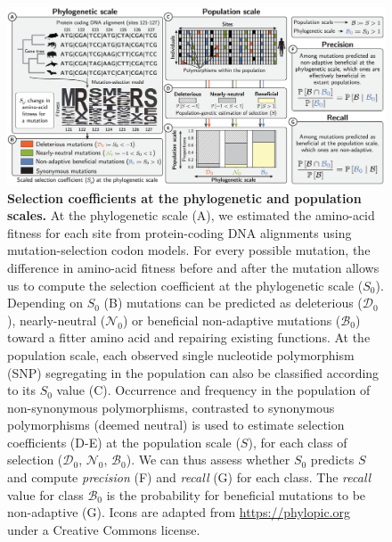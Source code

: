 \documentclass[10pt,letterpaper]{article}
\newcommand{\Sphy}{S_{0}}
\newcommand{\SphyDel}{\mathcal{D}_0}
\newcommand{\SphyNeu}{\mathcal{N}_0}
\newcommand{\SphyBen}{\mathcal{B}_0}
\newcommand{\Spop}{S}
\begin{document}
\begin{figure}[!ht]
\begin{adjustwidth}{-2.25in}{0in} %
\centering
\includegraphics[width=1.4\textwidth, page=1] {figure2.eps}
\caption{
{\bf Selection coefficients at the phylogenetic and population scales.}
At the phylogenetic scale (A), we estimated the amino-acid fitness for each site from protein-coding DNA alignments using mutation-selection codon models.
For every possible mutation, the difference in amino-acid fitness before and after the mutation allows us to compute the selection coefficient at the phylogenetic scale ($\Sphy$).
Depending on $\Sphy$ (B) mutations can be predicted as deleterious ($\SphyDel$), nearly-neutral ($\SphyNeu$) or beneficial non-adaptive mutations ($\SphyBen$) toward a fitter amino acid and repairing existing functions.
At the population scale, each observed single nucleotide polymorphism (SNP) segregating in the population can also be classified according to its $\Sphy$ value (C).
Occurrence and frequency in the population of non-synonymous polymorphisms, contrasted to synonymous polymorphisms (deemed neutral) is used to estimate selection coefficients (D-E) at the population scale ($\Spop$), for each class of selection ($\SphyDel$, $\SphyNeu$, $\SphyBen$).
We can thus assess whether $\Sphy$ predicts $\Spop$ and compute \textit{precision} (F) and \textit{recall} (G) for each class.
The \textit{recall} value for class $\SphyBen$ is the probability for beneficial mutations to be non-adaptive (G).
Icons are adapted from \href{https://phylopic.org}{https://phylopic.org} under a Creative Commons license.
}
\label{fig:method}
\end{adjustwidth}
\end{figure}
\end{document}
